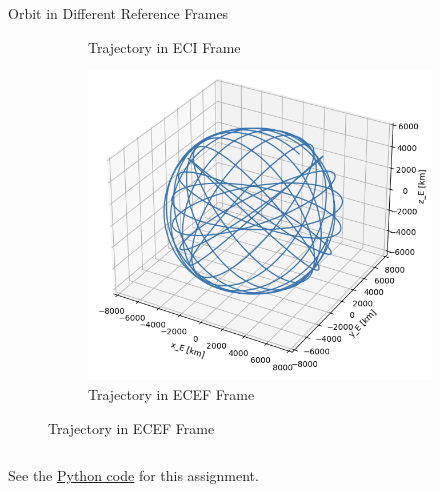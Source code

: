 \begin{hwkProblem}{2}{Orbit in Different Reference Frames}
\begin{figure}[H]
\begin{center}
\begin{subfigure}{0.3\textwidth}
				\caption{Trajectory in ECI Frame}
			\end{subfigure}
			\hfill
			\begin{subfigure}{0.3\textwidth} \label{fig:s02a3}
				\includegraphics[width=\linewidth]{./outputs/figures/s02a3.png}
				\caption{Trajectory in ECEF Frame}
			\end{subfigure}
		\end{center}
	\end{figure}

	\hwkPart{} \label{hwk:s02b}

	\inputminted{python}{./outputs/text/s02b.txt}

	\hwkCode{} \label{code:s02}

	See the \href{https://www.github.com/vaisriv/enae441-hw02/blob/main/src/hw02.py}{Python code} for this assignment.

\end{hwkProblem}

